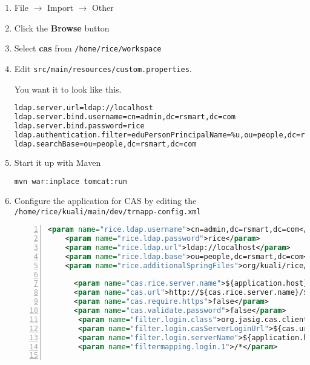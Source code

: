 \begin{enumerate}
\item File $\rightarrow$ Import $\rightarrow$ Other


\item Click the \textbf{Browse} button
\item Select \textbf{cas} from \verb|/home/rice/workspace|

\item Edit \verb|src/main/resources/custom.properties|.

 You want it to look like this.
\begin{lstlisting}[language=bash,basicstyle=\scriptsize,backgroundcolor=\color{ubergray},caption={src/main/resources/custom.properties},frame=single,breaklines=true]
ldap.server.url=ldap://localhost
ldap.server.bind.username=cn=admin,dc=rsmart,dc=com
ldap.server.bind.password=rice
ldap.authentication.filter=eduPersonPrincipalName=%u,ou=people,dc=rsmart,dc=com
ldap.searchBase=ou=people,dc=rsmart,dc=com
\end{lstlisting}
\item Start it up with Maven
\begin{lstlisting}[language=bash,basicstyle=\scriptsize,backgroundcolor=\color{ubergray},caption={src/main/resources/custom.properties},frame=single,breaklines=true]
mvn war:inplace tomcat:run
\end{lstlisting}
\item Configure the application for CAS by editing the
  \verb|/home/rice/kuali/main/dev/trnapp-config.xml|
\begin{lstlisting}[numbers=left,language=xml,basicstyle=\scriptsize,backgroundcolor=\color{ubergray},caption={src/main/resources/custom.properties},frame=single,breaklines=true]
	<param name="rice.ldap.username">cn=admin,dc=rsmart,dc=com</param>
    <param name="rice.ldap.password">rice</param>
    <param name="rice.ldap.url">ldap://localhost</param>
    <param name="rice.ldap.base">ou=people,dc=rsmart,dc=com</param>
	<param name="rice.additionalSpringFiles">org/kuali/rice/kim/config/KIMLdapSpringBeans.xml</param>

      <param name="cas.rice.server.name">${application.host}:8081</param>
      <param name="cas.url">http://${cas.rice.server.name}/${cas.context.name}</param>
      <param name="cas.require.https">false</param>
      <param name="cas.validate.password">false</param>
       <param name="filter.login.class">org.jasig.cas.client.authentication.AuthenticationFilter</param>
       <param name="filter.login.casServerLoginUrl">${cas.url}/login</param>
       <param name="filter.login.serverName">${application.host}:${http.port}</param>
       <param name="filtermapping.login.1">/*</param>


\end{lstlisting}
\end{enumerate}
